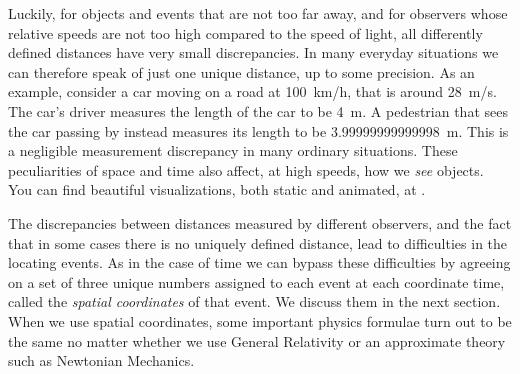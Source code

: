 Luckily, for objects and events that are not too far away, and for observers whose relative speeds are not too high compared to the speed of light, all differently defined distances have very small discrepancies. In many everyday situations we can therefore speak of just one unique distance, up to some precision. As an example, consider a car moving on a road at \qty{100}{km/h}, that is around \qty{28}{m/s}. The car's driver measures the length of the car to be \qty{4}{m}. A pedestrian that sees the car passing by instead measures its length to be \qty{3.99999999999998}{m}. This is a negligible measurement discrepancy in many ordinary situations.
%
%
These peculiarities of space and time also affect, at high speeds, how we \emph{see} objects. You can find beautiful visualizations, both static and animated, at \textit{}.



\smallskip

The discrepancies between distances measured by different observers, and the fact that in some cases there is no uniquely defined distance, lead to difficulties in the locating events. As in the case of time we can bypass these difficulties by agreeing on a set of three unique numbers assigned to each event at each coordinate time, called the \emph{spatial coordinates} of that event. We discuss them in the next section. When we use spatial coordinates, some important physics formulae turn out to be the same no matter whether we use General Relativity or an approximate theory such as Newtonian Mechanics.






